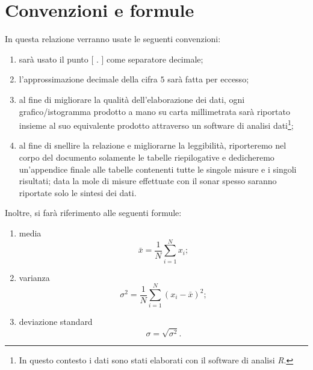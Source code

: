 \documentclass[10pt,oneside,a4paper]{article}
\begin{document}
\section{Convenzioni e formule}
In questa relazione verranno usate le seguenti convenzioni:
\begin{enumerate}
	\item sarà usato il punto [ $.$ ] come separatore decimale;
	\item l'approssimazione decimale della cifra $5$ sarà fatta per eccesso;
	\item al fine di migliorare la qualità dell'elaborazione dei dati, ogni grafico/istogramma prodotto a mano su carta millimetrata sarà riportato insieme al suo equivalente prodotto attraverso un software di analisi dati\footnote{In questo contesto i dati sono stati elaborati con il software di analisi \emph{R}.};
	\item al fine di snellire la relazione e migliorarne la leggibilità, riporteremo nel corpo del documento solamente le tabelle riepilogative e dedicheremo un'appendice finale alle tabelle contenenti tutte le singole misure e i singoli risultati; data la mole di misure effettuate con il sonar spesso saranno riportate solo le sintesi dei dati.
\end{enumerate}
Inoltre, si farà riferimento alle seguenti formule:
\begin{enumerate}
	\item media 
	\begin{equation}\label{eq:media}
	\bar{x} = \frac{1}{N}\sum_{i=1}^Nx_i;
	\end{equation}
	\item varianza
	\begin{equation}\label{eq:varianza}
	\sigma^2 = \frac{1}{N}\sum_{i=1}^N(x_i-\bar{x})^2;
	\end{equation}
	\item deviazione standard
	\begin{equation}\label{eq:deviazione}
	\sigma = \sqrt{\sigma^2}.
	\end{equation}	
\end{enumerate}

\end{document}
